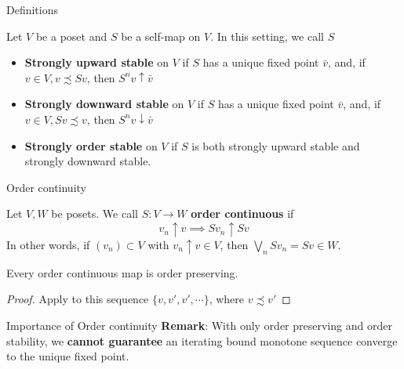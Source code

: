 \begin{frame}{Definitions}
\begin{definition}
Let $V$ be a poset and $S$ be a self-map on $V$. In this setting, we call $S$
\begin{itemize}
    \item \textbf{Strongly upward stable} on $V$ if $S$ has a unique fixed point $\bar v$, and, if $v\in V, v\precsim Sv$, then $S^nv\uparrow \bar v$
    \item \textbf{Strongly downward stable} on $V$ if $S$ has a unique fixed point $\bar v$, and, if $v\in V, Sv\precsim v$, then $S^nv\downarrow \bar v$
    \item \textbf{Strongly order stable} on $V$ if $S$ is both strongly upward stable and strongly downward stable.
\end{itemize}
\end{definition}
\end{frame}
\begin{frame}{Order continuity}

    \begin{definition}
    Let $V, W$ be posets. We call $S: V\to W$ \textbf{order continuous} if 
    $$
    v_n\uparrow v \implies Sv_n\uparrow Sv
    $$
    In other words, if $(v_n)\subset V$ with $v_n\uparrow v\in V$, then $\bigvee_n S v_n = Sv\in W$.
     \end{definition}
     \begin{lemma}
         Every order continuous map is order preserving.
     \end{lemma}
     \begin{proof}
         Apply to this sequence $\{v,v',v',\cdots\}$, where $v\precsim v'$
     \end{proof}
\end{frame}
\begin{frame}{Importance of Order continuity}
\textbf{Remark}: With only order preserving and order stability, we \textbf{cannot guarantee} an iterating bound monotone sequence converge to the unique fixed point.
    
\end{frame}